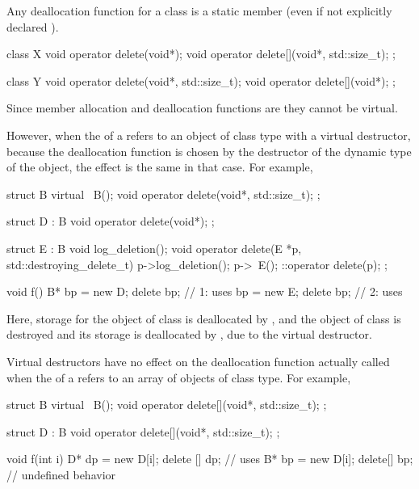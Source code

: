 \pnum
{}%
Any deallocation function for a class
is a static member (even if not explicitly declared
).
\begin{example}
\begin{codeblock}
class X {
  void operator delete(void*);
  void operator delete[](void*, std::size_t);
};

class Y {
  void operator delete(void*, std::size_t);
  void operator delete[](void*);
};
\end{codeblock}
\end{example}

\pnum
Since member allocation and deallocation functions are
they cannot be virtual.
\begin{note}
However, when the
of a
refers to an object of class type with a virtual destructor,
because the deallocation function is chosen by the destructor
of the dynamic type of the object, the effect is the same in that case.
For example,
\begin{codeblock}
struct B {
  virtual ~B();
  void operator delete(void*, std::size_t);
};

struct D : B {
  void operator delete(void*);
};

struct E : B {
  void log_deletion();
  void operator delete(E *p, std::destroying_delete_t) {
    p->log_deletion();
    p->~E();
    ::operator delete(p);
  }
};

void f() {
  B* bp = new D;
  delete bp;        // 1: uses 
  bp = new E;
  delete bp;        // 2: uses 
}
\end{codeblock}
Here, storage for the object of class
is deallocated by
,
and
the object of class  is destroyed
and its storage is deallocated
by ,
due to the virtual destructor.
\end{note}
\begin{note}
Virtual destructors have no effect on the deallocation function actually
called when the
of a
refers to an array of objects of class type.
For example,
\begin{codeblock}
struct B {
  virtual ~B();
  void operator delete[](void*, std::size_t);
};

struct D : B {
  void operator delete[](void*, std::size_t);
};

void f(int i) {
  D* dp = new D[i];
  delete [] dp;     // uses 
  B* bp = new D[i];
  delete[] bp;      // undefined behavior
}
\end{codeblock}
\end{note}

